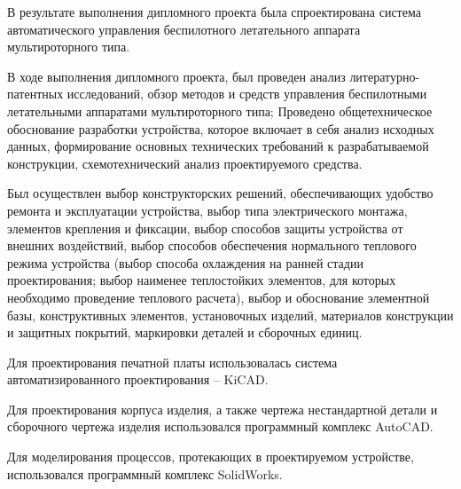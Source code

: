 
В результате выполнения дипломного проекта была спроектирована система
автоматического управления беспилотного летательного аппарата
мультироторного типа.

В ходе выполнения дипломного проекта, был проведен анализ
литературно-патентных исследований, обзор методов и средств управления
беспилотными летательными аппаратами мультироторного типа;
Проведено общетехническое обоснование разработки устройства, которое
включает в себя анализ исходных данных, формирование основных
технических требований к разрабатываемой конструкции, схемотехнический
анализ проектируемого средства.


Был осуществлен выбор конструкторских решений, обеспечивающих удобство
ремонта и эксплуатации устройства, выбор типа электрического монтажа,
элементов крепления и фиксации, выбор способов защиты устройства от
внешних воздействий, выбор способов обеспечения нормального теплового
режима устройства (выбор способа охлаждения на ранней стадии
проектирования; выбор наименее теплостойких элементов, для которых
необходимо проведение теплового расчета), выбор и обоснование
элементной базы, конструктивных элементов, установочных изделий,
материалов конструкции и защитных покрытий, маркировки деталей и
сборочных единиц.



Для проектирования печатной платы использовалась система
автоматизированного проектирования – KiCAD.

Для проектирования корпуса изделия, а также чертежа нестандартной
детали и сборочного чертежа изделия использовался программный комплекс
AutoCAD.

Для моделирования процессов, протекающих в проектируемом устройстве,
использовался программный комплекс SolidWorks.

